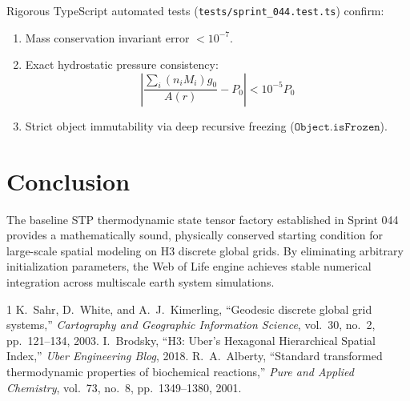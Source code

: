 \documentclass[10pt,journal,compsoc]{IEEEtran}
\begin{document}
Rigorous TypeScript automated tests (\texttt{tests/sprint\_044.test.ts}) confirm:
\begin{enumerate}
    \item Mass conservation invariant error $< 10^{-7}$.
    \item Exact hydrostatic pressure consistency:
    \begin{equation}
        \left| \frac{\sum_i (n_i M_i) g_0}{A(r)} - P_0 \right| < 10^{-5} P_0
    \end{equation}
    \item Strict object immutability via deep recursive freezing ($\mathtt{Object.isFrozen}$).
\end{enumerate}

\section{Conclusion}
The baseline STP thermodynamic state tensor factory established in Sprint 044 provides a mathematically sound, physically conserved starting condition for large-scale spatial modeling on H3 discrete global grids. By eliminating arbitrary initialization parameters, the Web of Life engine achieves stable numerical integration across multiscale earth system simulations.


\begin{thebibliography}{1}
K.~Sahr, D.~White, and A.~J.~Kimerling, ``Geodesic discrete global grid systems,'' \emph{Cartography and Geographic Information Science}, vol.~30, no.~2, pp.~121--134, 2003.
I.~Brodsky, ``H3: Uber's Hexagonal Hierarchical Spatial Index,'' \emph{Uber Engineering Blog}, 2018.
R.~A.~Alberty, ``Standard transformed thermodynamic properties of biochemical reactions,'' \emph{Pure and Applied Chemistry}, vol.~73, no.~8, pp.~1349--1380, 2001.
\end{thebibliography}
\end{document}

